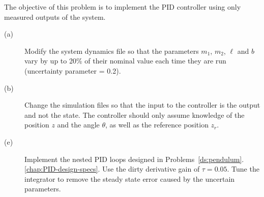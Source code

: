 The objective of this problem is to implement the PID controller using only measured outputs of the system.
\begin{description}
\item[(a)]  Modify the system dynamics file so that the parameters $m_1$, $m_2$, $\ell$ and $b$ vary by up to 20\% of their nominal value each time they are run (uncertainty parameter = 0.2).
\item[(b)]  Change the simulation files so that the input to the controller is the output and not the state.  The controller should only assume knowledge of the position $z$ and the angle $\theta$, as well as the reference position $z_r$.
\item[(e)]  Implement the nested PID loops designed in Problems~\ref{ds:pendulum}.\ref{chap:PID-design-specs}.  Use the dirty derivative gain of $\tau=0.05$. Tune the integrator to remove the steady state error caused by the uncertain parameters.
\end{description}


